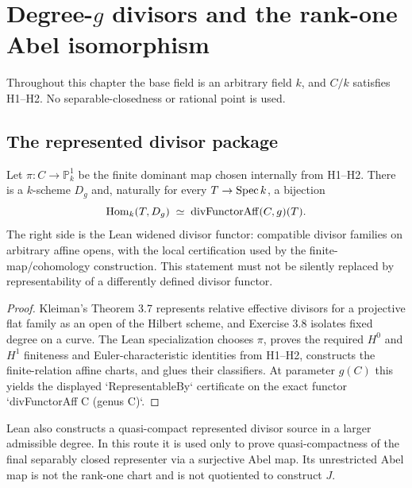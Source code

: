 \chapter{Degree-$g$ divisors and the rank-one Abel isomorphism}
\label{route-ch-rank-one}

Throughout this chapter the base field is an arbitrary field \(k\), and
\(C/k\) satisfies H1--H2.  No separable-closedness or rational point is used.

\section{The represented divisor package}

\begin{theorem}
  \label{route-thm-divisor-representer}
  \leanok

  Let \(\pi:C\to\mathbb P^1_k\) be the finite dominant map chosen internally
  from H1--H2.  There is a \(k\)-scheme \(D_g\) and, naturally for every
  \(T\to\operatorname{Spec} k\), a bijection
  \[
    \operatorname{Hom}_k(T,D_g)\;\simeq\;
    \operatorname{divFunctorAff}(C,g)(T).
  \]
  The right side is the Lean widened divisor functor: compatible divisor
  families on arbitrary affine opens, with the local certification used by
  the finite-map/cohomology construction.  This statement must not be silently
  replaced by representability of a differently defined divisor functor.
\end{theorem}

\begin{proof}
  Kleiman's Theorem 3.7 represents relative effective divisors for a
  projective flat family as an open of the Hilbert scheme, and Exercise 3.8
  isolates fixed degree on a curve.  The Lean specialization chooses \(\pi\),
  proves the required \(H^0\) and \(H^1\) finiteness and Euler-characteristic
  identities from H1--H2, constructs the finite-relation affine charts, and
  glues their classifiers.  At parameter \(g(C)\) this yields the displayed
  `RepresentableBy` certificate on the exact functor
  `divFunctorAff C (genus C)`.
\end{proof}

\begin{definition}
  \label{route-rem-admissible-source}
  \leanok

  Lean also constructs a quasi-compact represented divisor source in a larger
  admissible degree.  In this route it is used only to prove quasi-compactness
  of the final separably closed representer via a surjective Abel map.  Its
  unrestricted Abel map is not the rank-one chart and is not quotiented to
  construct \(J\).
\end{definition}

